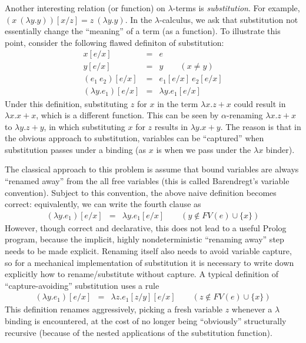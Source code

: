 \documentclass[draft,12pt]{report}
\begin{document}
Another interesting relation (or function) on $\lambda$-terms is
\emph{substitution}.  For example, $(x~(\lambda y.y))[x/z] =
z~(\lambda y.y)$.  In the $\lambda$-calculus, we ask that substitution
not essentially change the ``meaning'' of a term (as a function).  To
illustrate this point, consider the following flawed definiton of
substitution:
\begin{eqnarray*}
x[e/x] &=& e\\
y[e/x] &=& y \qquad (x \neq y)\\
(e_1~e_2)[e/x] &=& e_1[e/x]~e_2[e/x]\\
(\lambda y.e_1)[e/x] &=& \lambda y.e_1[e/x]
\end{eqnarray*}
Under this definition, substituting $z$ for $x$ in the term $\lambda
x. z+x$ could result in $\lambda x. x+x$, which is a different
function.  This can be seen by $\alpha$-renaming $\lambda x.z+x$ to
$\lambda y.z+y$, in which substituting $x$ for $z$ results in $\lambda
y.x + y$.  The reason is that in the obvious approach to substitution,
variables can be ``captured'' when substitution passes under a binding
(as $x$ is when we pass under the $\lambda x$ binder).

The classical approach to this problem is assume that bound variables 
are always ``renamed away'' from the all free variables
(this is called Barendregt's variable convention).  Subject to this
convention, the above naive definition becomes correct: equivalently,
we can write the fourth clause as
\begin{eqnarray*}
(\lambda y.e_1)[e/x] &=& \lambda y.e_1[e/x]\qquad(y \notin FV(e)\cup\{x\})
\end{eqnarray*}
However, though correct and declarative, this does not lead to  a useful Prolog program,
because the implicit, highly nondeterministic ``renaming away'' step
needs to be made explicit.  Renaming itself also needs to avoid
variable capture, so for a mechanical implementation of substitution
it is necessary to write down explicitly how to rename/substitute
without capture.  A typical definition of ``capture-avoiding''
substitution uses a rule
\begin{eqnarray*}
(\lambda y.e_1)[e/x] &=& \lambda z.e_1[z/y][e/x]\qquad(z \notin FV(e)\cup\{x\})
\end{eqnarray*}
This definition renames aggressively, picking a fresh variable $z$
whenever a $\lambda$ binding is encountered, at the cost of no longer
being ``obviously'' structurally recursive (because of the nested applications of the substitution function).
\end{document}
